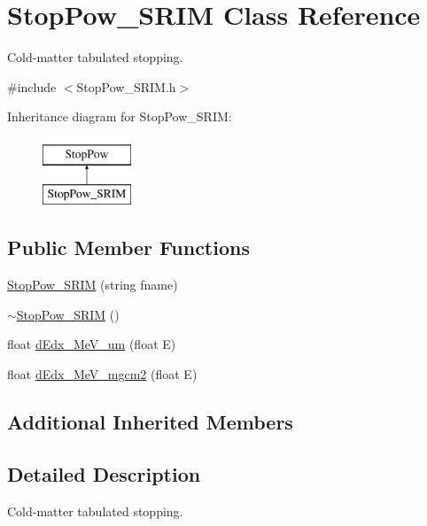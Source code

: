 \hypertarget{class_stop_pow___s_r_i_m}{\section{Stop\-Pow\-\_\-\-S\-R\-I\-M Class Reference}
\label{class_stop_pow___s_r_i_m}
}


Cold-\/matter tabulated stopping.  




{\ttfamily \#include $<$Stop\-Pow\-\_\-\-S\-R\-I\-M.\-h$>$}

Inheritance diagram for Stop\-Pow\-\_\-\-S\-R\-I\-M\-:\begin{figure}[H]
\begin{center}
\leavevmode
\includegraphics[height=2.000000cm]{class_stop_pow___s_r_i_m}
\end{center}
\end{figure}
\subsection*{Public Member Functions}
\begin{DoxyCompactItemize}
\item 
\hyperlink{class_stop_pow___s_r_i_m_ab901771706e85a82531b0be9b01642b5}{Stop\-Pow\-\_\-\-S\-R\-I\-M} (string fname)
\item 
\hyperlink{class_stop_pow___s_r_i_m_a62aef1b8aee5d00c49e9bc04ef891a2d}{$\sim$\-Stop\-Pow\-\_\-\-S\-R\-I\-M} ()
\item 
float \hyperlink{class_stop_pow___s_r_i_m_a762011aa6430e95dc3e06bf8d5791b05}{d\-Edx\-\_\-\-Me\-V\-\_\-um} (float E)
\item 
float \hyperlink{class_stop_pow___s_r_i_m_acd593e878322cc5e65649c2346242188}{d\-Edx\-\_\-\-Me\-V\-\_\-mgcm2} (float E)
\end{DoxyCompactItemize}
\subsection*{Additional Inherited Members}


\subsection{Detailed Description}
Cold-\/matter tabulated stopping. 

